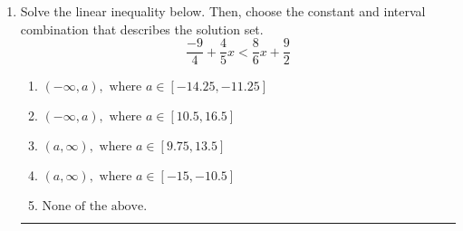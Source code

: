\documentclass[14pt]{extbook}
\newcommand{\litem}[1]{\item#1\hspace*{-1cm}\rule{\textwidth}{0.4pt}}
\begin{document}
\begin{enumerate}
{\begin{enumerate}[label=\Alph*.]
\end{enumerate} }
\litem{
Solve the linear inequality below. Then, choose the constant and interval combination that describes the solution set.\[ \frac{-9}{4} + \frac{4}{5} x < \frac{8}{6} x + \frac{9}{2} \]\begin{enumerate}[label=\Alph*.]
\item \( (-\infty, a), \text{ where } a \in [-14.25, -11.25] \)
\item \( (-\infty, a), \text{ where } a \in [10.5, 16.5] \)
\item \( (a, \infty), \text{ where } a \in [9.75, 13.5] \)
\item \( (a, \infty), \text{ where } a \in [-15, -10.5] \)
\item \( \text{None of the above}. \)

\end{enumerate} }
\end{enumerate}
\end{document}
